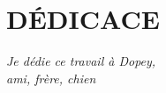\chapter*{DÉDICACE}\thispagestyle{headings}
\begin{flushright}
  \itshape
  Je dédie ce travail à Dopey,\\
  ami, frère, chien
\end{flushright}
